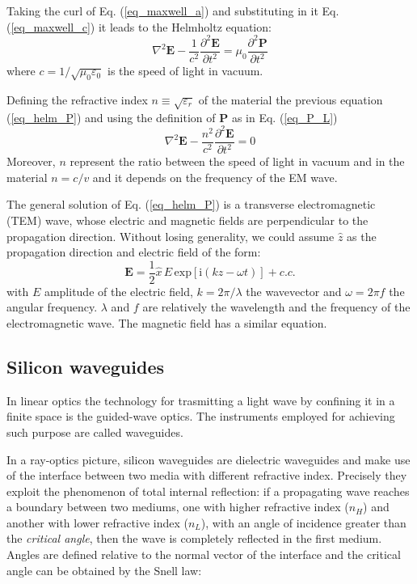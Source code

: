 \documentclass[12pt,a4paper,twoside]{article}
\begin{document}
Taking the curl of Eq. (\ref{eq_maxwell_a}) and substituting in it Eq. (\ref{eq_maxwell_c}) it leads to the Helmholtz equation:
\begin{equation}
\nabla^2 \textbf{E} - \frac{1}{c^2}\frac{\partial^2 \textbf{E}}{\partial t^2} = \mu_0\frac{\partial^2 \textbf{P}}{\partial t^2}
\label{eq_helm_P}
\end{equation}
where $c = 1/\sqrt{\mu_0 \varepsilon_0}$ is the speed of light in vacuum.

Defining the refractive index $n \equiv \sqrt{\varepsilon_r}$ of the material the previous equation (\ref{eq_helm_P}) and using the definition of \textbf{P} as in Eq. (\ref{eq_P_L})
\begin{equation}
	\nabla^2 \textbf{E} - \frac{n^2}{c^2}\frac{\partial^2 \textbf{E}}{\partial t^2} = 0
	\label{eq_helm_lin}
\end{equation}
Moreover, $n$ represent the ratio between the speed of light in vacuum and in the material $n = c/v$ and it depends on the frequency of the EM wave.

The general solution of Eq. (\ref{eq_helm_P}) is a transverse electromagnetic (TEM) wave, whose electric and magnetic fields are perpendicular to the propagation direction.
Without losing generality, we could assume $\hat{z}$ as the propagation direction and electric field of the form:
\begin{equation}
	\textbf{E} = \frac{1}{2}\hat{x}\,E\,\mathrm{exp}[\mathrm{i}(kz-\omega t)] + c.c.
	\label{eq_wave}
\end{equation}
with $E$ amplitude of the electric field, $k = 2\pi/\lambda$ the wavevector and $\omega = 2\pi f$ the angular frequency. $\lambda$ and $f$ are relatively the wavelength and the frequency of the electromagnetic wave.
The magnetic field has a similar equation.

\subsection{Silicon waveguides}
In linear optics the technology for trasmitting a light wave by confining it in a finite space is the guided-wave optics.
The instruments employed for achieving such purpose are called waveguides.

In a ray-optics picture, silicon waveguides are dielectric waveguides and make use of the interface between two media with different refractive index.
Precisely they exploit the phenomenon of total internal reflection: if a propagating wave reaches a boundary between two mediums, one with higher refractive index ($n_H$) and another with lower refractive index ($n_L$), with an angle of incidence greater than the \textit{critical angle}, then the wave is completely reflected in the first medium.
Angles are defined relative to the normal vector of the interface and the critical angle can be obtained by the Snell law:
\end{document}
